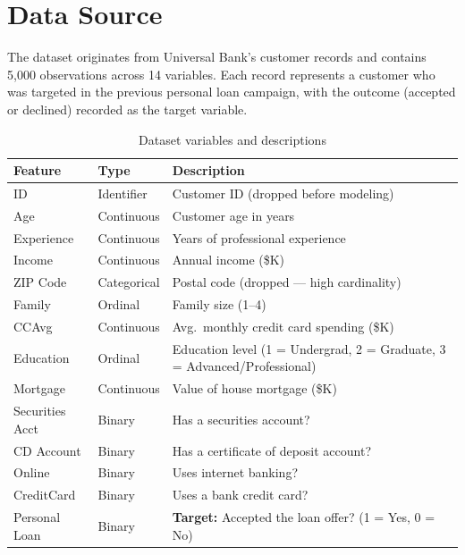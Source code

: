\documentclass[11pt, a4paper]{article}
\begin{document}
\section{Data Source}

The dataset originates from Universal Bank's customer records and contains
5{,}000 observations across 14 variables. Each record represents a customer
who was targeted in the previous personal loan campaign, with the outcome
(accepted or declined) recorded as the target variable.

\begin{table}[H]
\centering
\caption{Dataset variables and descriptions}
\label{tab:features}
\begin{tabular}{@{} l l p{7.5cm} @{}}
\toprule
\textbf{Feature} & \textbf{Type} & \textbf{Description} \\
\midrule
ID             & Identifier  & Customer ID (dropped before modeling) \\
Age            & Continuous  & Customer age in years \\
Experience     & Continuous  & Years of professional experience \\
Income         & Continuous  & Annual income (\$K) \\
ZIP Code       & Categorical & Postal code (dropped --- high cardinality) \\
Family         & Ordinal     & Family size (1--4) \\
CCAvg          & Continuous  & Avg.\ monthly credit card spending (\$K) \\
Education      & Ordinal     & Education level (1 = Undergrad, 2 = Graduate, 3 = Advanced/Professional) \\
Mortgage       & Continuous  & Value of house mortgage (\$K) \\
Securities Acct & Binary     & Has a securities account? \\
CD Account     & Binary      & Has a certificate of deposit account? \\
Online         & Binary      & Uses internet banking? \\
CreditCard     & Binary      & Uses a bank credit card? \\
\midrule
Personal Loan  & Binary      & \textbf{Target:} Accepted the loan offer? (1 = Yes, 0 = No) \\
\bottomrule
\end{tabular}
\end{table}
\end{document}
